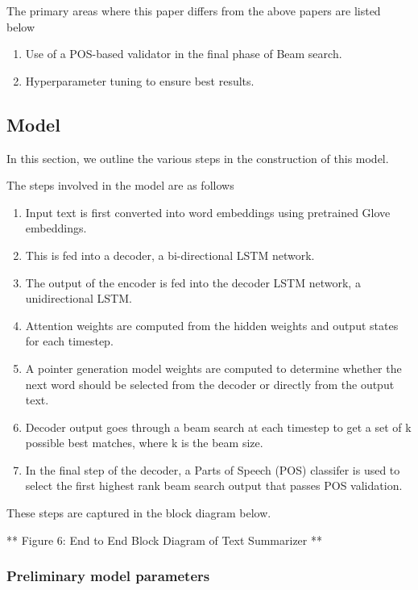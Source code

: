 \documentclass[11pt]{article}
\providecommand{\tightlist}{%
      \setlength{\itemsep}{0pt}\setlength{\parskip}{0pt}}
\begin{document}
The primary areas where this paper differs from the above papers are
listed below

\begin{enumerate}
\def\labelenumi{\arabic{enumi}.}
\tightlist
\item
  Use of a POS-based validator in the final phase of Beam search.
\item
  Hyperparameter tuning to ensure best results.
\end{enumerate}

\subsection{Model}\label{model}

In this section, we outline the various steps in the construction of
this model.

The steps involved in the model are as follows

\begin{enumerate}
\def\labelenumi{\arabic{enumi}.}
\tightlist
\item
  Input text is first converted into word embeddings using pretrained
  Glove embeddings.
\item
  This is fed into a decoder, a bi-directional LSTM network.
\item
  The output of the encoder is fed into the decoder LSTM network, a
  unidirectional LSTM.
\item
  Attention weights are computed from the hidden weights and output
  states for each timestep.
\item
  A pointer generation model weights are computed to determine whether
  the next word should be selected from the decoder or directly from the
  output text.\\
\item
  Decoder output goes through a beam search at each timestep to get a
  set of k possible best matches, where k is the beam size.
\item
  In the final step of the decoder, a Parts of Speech (POS) classifer is
  used to select the first highest rank beam search output that passes
  POS validation.
\end{enumerate}

These steps are captured in the block diagram below.

 ** Figure 6: End to End Block Diagram of Text Summarizer **

\subsubsection{Preliminary model
parameters}\label{preliminary-model-parameters}
\end{document}
